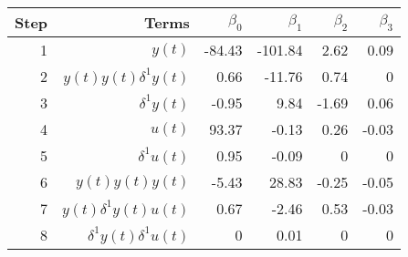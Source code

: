 \begin{tabular}{rrrrrr}
Step & Terms & $\beta_{0}$ & $\beta_{1}$ & $\beta_{2}$ & $\beta_{3}$ \\ 
\hline 
1 & $y(t)$ & -84.43 & -101.84 & 2.62 & 0.09 \\ 
2 & $y(t)y(t)\delta^1 y(t)$ & 0.66 & -11.76 & 0.74 & 0 \\ 
3 & $\delta^1 y(t)$ & -0.95 & 9.84 & -1.69 & 0.06 \\ 
4 & $u(t)$ & 93.37 & -0.13 & 0.26 & -0.03 \\ 
5 & $\delta^1 u(t)$ & 0.95 & -0.09 & 0 & 0 \\ 
6 & $y(t)y(t)y(t)$ & -5.43 & 28.83 & -0.25 & -0.05 \\ 
7 & $y(t)\delta^1 y(t)u(t)$ & 0.67 & -2.46 & 0.53 & -0.03 \\ 
8 & $\delta^1 y(t)\delta^1 u(t)$ & 0 & 0.01 & 0 & 0 \\ 
\hline 
\end{tabular}